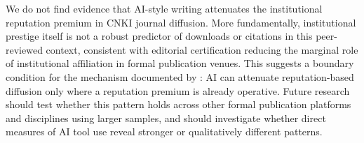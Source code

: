 \documentclass[12pt,a4paper]{article}
\begin{document}
We do not find evidence that AI-style writing attenuates the
institutional reputation premium in CNKI journal diffusion.
More fundamentally, institutional prestige itself is not a robust
predictor of downloads or citations in this peer-reviewed context,
consistent with editorial certification reducing the marginal role
of institutional affiliation in formal publication venues.
This suggests a boundary condition for the mechanism documented by
\citet{JoLi2026}: AI can attenuate reputation-based diffusion only
where a reputation premium is already operative.
Future research should test whether this pattern holds across other
formal publication platforms and disciplines using larger samples, and
should investigate whether direct measures of AI tool use reveal
stronger or qualitatively different patterns.


\end{document}
